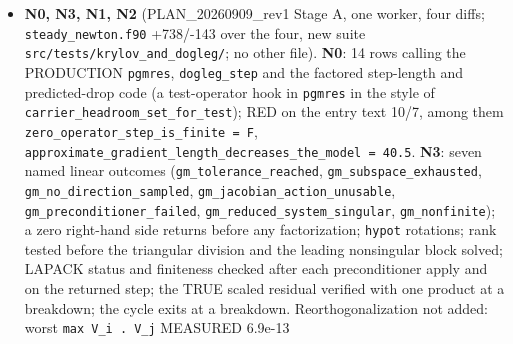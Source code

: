 \documentclass[english,a4paper]{my_memo}
\begin{document}
\begin{itemize}
  the module compiles clean under the suite\textquotesingle s \texttt{-fcheck=all}). No manual
  entry (the manual carries no run-mode or clock text; nothing in it
  became false). \textbf{Advisor}: file scope as briefed; six British \texttt{per\ cent} (two new, four pre-existing) changed to \texttt{percent}. \textbf{Reported, not
  fixed (outside the item)}: (1) the accepted state of a retried
  macrostep depends on which pass was rejected, up to 9.1e-5 relative in
  the base cell\textquotesingle s velocity (5e-6 elsewhere), with the checkpoint round trip
  exact, so some state read by the coupled source step is neither saved nor
  rebuilt (seeds or caches of \texttt{ionization\_equilibrium},
  \texttt{constrained\_chemical\_equilibrium}, \texttt{diffusive\_photochemistry}): a
  rejected attempt is not yet without consequence; (2) one interval of the
  order sequence (\texttt{H} 6.48e-5 s from the 0.405 controller reduction) sits
  2.3x off the \texttt{H\^{}2} law the other seven follow, unexplained, for N16b;
  (3) \texttt{err\_rtol\ =\ 1e-3}, \texttt{err\_atol\ =\ 1e-12} are flat, unvalidated and cover
  no species (N16b); the gate now shortens physical-mode steps by about
  two at the sampled steps on this case.
\item
  \textbf{N0, N3, N1, N2} (PLAN\_20260909\_rev1 Stage A, one worker, four diffs;
  \texttt{steady\_newton.f90} +738/-143 over the four, new suite
  \texttt{src/tests/krylov\_and\_dogleg/}; no other file). \textbf{N0}: 14 rows calling
  the PRODUCTION \texttt{pgmres}, \texttt{dogleg\_step} and the factored step-length and
  predicted-drop code (a test-operator hook in \texttt{pgmres} in the style of
  \texttt{carrier\_headroom\_set\_for\_test}); RED on the entry text 10/7, among them
  \texttt{zero\_operator\_step\_is\_finite\ =\ F},
  \texttt{approximate\_gradient\_length\_decreases\_the\_model\ =\ 40.5}. \textbf{N3}: seven
  named linear outcomes (\texttt{gm\_tolerance\_reached}, \texttt{gm\_subspace\_exhausted},
  \texttt{gm\_no\_direction\_sampled}, \texttt{gm\_jacobian\_action\_unusable},
  \texttt{gm\_preconditioner\_failed}, \texttt{gm\_reduced\_system\_singular}, \texttt{gm\_nonfinite});
  a zero right-hand side returns before any factorization; \texttt{hypot}
  rotations; rank tested before the triangular division and the leading
  nonsingular block solved; LAPACK status and finiteness checked after each
  preconditioner apply and on the returned step; the TRUE scaled residual
  verified with one product at a breakdown; the cycle exits at a breakdown.
  Reorthogonalization not added: worst \texttt{max\ \textbar{}V\_i\ .\ V\_j\textbar{}} MEASURED 6.9e-13

\end{itemize}
\end{document}
